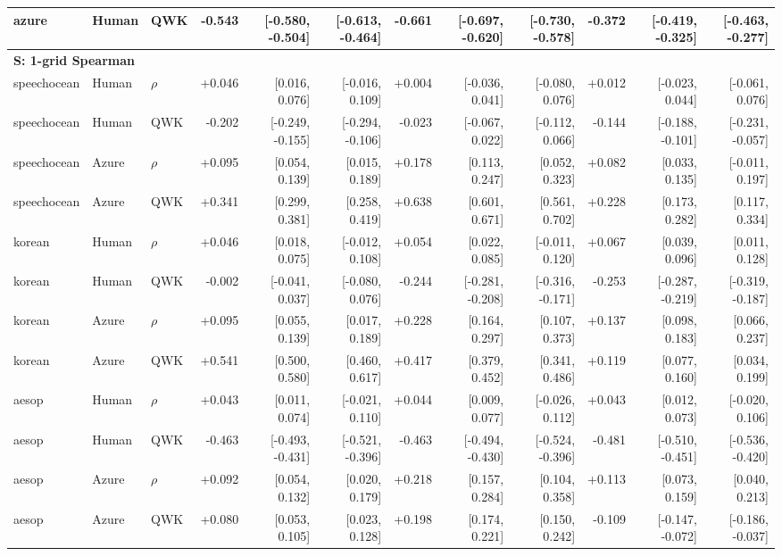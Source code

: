 \begin{landscape}
\begin{longtable}{@{}lllrrrrrrrrr@{}}
azure & Human & QWK & -0.543 & [-0.580, -0.504] & [-0.613, -0.464] & -0.661 & [-0.697, -0.620] & [-0.730, -0.578] & -0.372 & [-0.419, -0.325] & [-0.463, -0.277]\\
\midrule\multicolumn{12}{l}{\textbf{S: 1-grid Spearman}}\\*
speechocean & Human & $\rho$ & +0.046 & [0.016, 0.076] & [-0.016, 0.109] & +0.004 & [-0.036, 0.041] & [-0.080, 0.076] & +0.012 & [-0.023, 0.044] & [-0.061, 0.076]\\
speechocean & Human & QWK & -0.202 & [-0.249, -0.155] & [-0.294, -0.106] & -0.023 & [-0.067, 0.022] & [-0.112, 0.066] & -0.144 & [-0.188, -0.101] & [-0.231, -0.057]\\
speechocean & Azure & $\rho$ & +0.095 & [0.054, 0.139] & [0.015, 0.189] & +0.178 & [0.113, 0.247] & [0.052, 0.323] & +0.082 & [0.033, 0.135] & [-0.011, 0.197]\\
speechocean & Azure & QWK & +0.341 & [0.299, 0.381] & [0.258, 0.419] & +0.638 & [0.601, 0.671] & [0.561, 0.702] & +0.228 & [0.173, 0.282] & [0.117, 0.334]\\
\addlinespace[2pt]
korean & Human & $\rho$ & +0.046 & [0.018, 0.075] & [-0.012, 0.108] & +0.054 & [0.022, 0.085] & [-0.011, 0.120] & +0.067 & [0.039, 0.096] & [0.011, 0.128]\\
korean & Human & QWK & -0.002 & [-0.041, 0.037] & [-0.080, 0.076] & -0.244 & [-0.281, -0.208] & [-0.316, -0.171] & -0.253 & [-0.287, -0.219] & [-0.319, -0.187]\\
korean & Azure & $\rho$ & +0.095 & [0.055, 0.139] & [0.017, 0.189] & +0.228 & [0.164, 0.297] & [0.107, 0.373] & +0.137 & [0.098, 0.183] & [0.066, 0.237]\\
korean & Azure & QWK & +0.541 & [0.500, 0.580] & [0.460, 0.617] & +0.417 & [0.379, 0.452] & [0.341, 0.486] & +0.119 & [0.077, 0.160] & [0.034, 0.199]\\
\addlinespace[2pt]
aesop & Human & $\rho$ & +0.043 & [0.011, 0.074] & [-0.021, 0.110] & +0.044 & [0.009, 0.077] & [-0.026, 0.112] & +0.043 & [0.012, 0.073] & [-0.020, 0.106]\\
aesop & Human & QWK & -0.463 & [-0.493, -0.431] & [-0.521, -0.396] & -0.463 & [-0.494, -0.430] & [-0.524, -0.396] & -0.481 & [-0.510, -0.451] & [-0.536, -0.420]\\
aesop & Azure & $\rho$ & +0.092 & [0.054, 0.132] & [0.020, 0.179] & +0.218 & [0.157, 0.284] & [0.104, 0.358] & +0.113 & [0.073, 0.159] & [0.040, 0.213]\\
aesop & Azure & QWK & +0.080 & [0.053, 0.105] & [0.023, 0.128] & +0.198 & [0.174, 0.221] & [0.150, 0.242] & -0.109 & [-0.147, -0.072] & [-0.186, -0.037]\\

\end{longtable}
\end{landscape}
